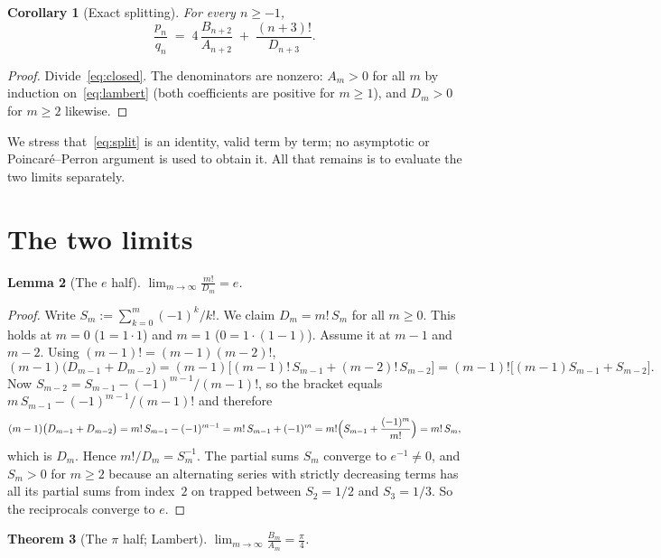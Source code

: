 \documentclass[11pt]{article}
\newtheorem{theorem}{Theorem}[section]
\newtheorem{lemma}[theorem]{Lemma}
\newtheorem{corollary}[theorem]{Corollary}
\theoremstyle{remark}
\begin{document}
\begin{corollary}[Exact splitting]\label{cor:split}
For every $n \ge -1$,
\begin{equation}\label{eq:split}
\frac{p_n}{q_n} \;=\; 4\,\frac{B_{n+2}}{A_{n+2}} \;+\; \frac{(n+3)!}{D_{n+3}}.
\end{equation}
\end{corollary}

\begin{proof}
Divide~\eqref{eq:closed}. The denominators are nonzero: $A_m>0$ for all $m$ by
induction on~\eqref{eq:lambert} (both coefficients are positive for $m\ge1$),
and $D_m>0$ for $m\ge2$ likewise.
\end{proof}

We stress that~\eqref{eq:split} is an identity, valid term by term; no
asymptotic or Poincar\'e--Perron argument is used to obtain it. All that
remains is to evaluate the two limits separately.

\section{The two limits}

\begin{lemma}[The $e$ half]\label{lem:e}
$\displaystyle \lim_{m\to\infty}\frac{m!}{D_m} = e$.
\end{lemma}

\begin{proof}
Write $S_m := \sum_{k=0}^{m}(-1)^k/k!$. We claim $D_m = m!\,S_m$ for all
$m\ge0$. This holds at $m=0$ ($1 = 1\cdot1$) and $m=1$ ($0 = 1\cdot(1-1)$).
Assume it at $m-1$ and $m-2$. Using $(m-1)! = (m-1)(m-2)!$,
\[
(m-1)\bigl(D_{m-1}+D_{m-2}\bigr)
= (m-1)\bigl[(m-1)!\,S_{m-1} + (m-2)!\,S_{m-2}\bigr]
= (m-1)!\bigl[(m-1)S_{m-1} + S_{m-2}\bigr].
\]
Now $S_{m-2} = S_{m-1} - (-1)^{m-1}/(m-1)!$, so the bracket equals
$m\,S_{m-1} - (-1)^{m-1}/(m-1)!$ and therefore
\[
(m-1)\bigl(D_{m-1}+D_{m-2}\bigr)
= m!\,S_{m-1} - (-1)^{m-1}
= m!\,S_{m-1} + (-1)^{m}
= m!\Bigl(S_{m-1} + \frac{(-1)^m}{m!}\Bigr)
= m!\,S_m,
\]
which is $D_m$. Hence $m!/D_m = S_m^{-1}$. The partial sums $S_m$ converge to
$e^{-1}\neq0$, and $S_m>0$ for $m\ge2$ because an alternating series with
strictly decreasing terms has all its partial sums from index~$2$ on trapped
between $S_2 = 1/2$ and $S_3 = 1/3$. So the reciprocals converge to $e$.
\end{proof}

\begin{theorem}[The $\pi$ half; Lambert]\label{thm:lambert}
$\displaystyle \lim_{m\to\infty}\frac{B_m}{A_m} = \frac{\pi}{4}$.
\end{theorem}
\end{document}
